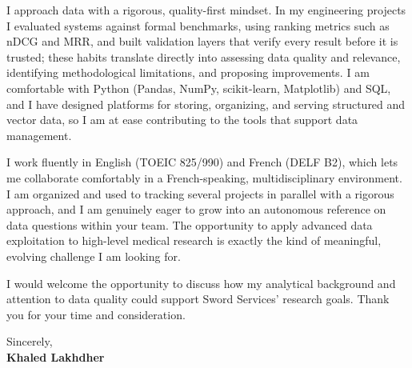 \documentclass[11pt,a4paper]{article}
\begin{document}
I approach data with a rigorous, quality-first mindset. In my engineering projects I evaluated systems against formal benchmarks, using ranking metrics such as nDCG and MRR, and built validation layers that verify every result before it is trusted; these habits translate directly into assessing data quality and relevance, identifying methodological limitations, and proposing improvements. I am comfortable with Python (Pandas, NumPy, scikit-learn, Matplotlib) and SQL, and I have designed platforms for storing, organizing, and serving structured and vector data, so I am at ease contributing to the tools that support data management.

I work fluently in English (TOEIC 825/990) and French (DELF B2), which lets me collaborate comfortably in a French-speaking, multidisciplinary environment. I am organized and used to tracking several projects in parallel with a rigorous approach, and I am genuinely eager to grow into an autonomous reference on data questions within your team. The opportunity to apply advanced data exploitation to high-level medical research is exactly the kind of meaningful, evolving challenge I am looking for.

I would welcome the opportunity to discuss how my analytical background and attention to data quality could support Sword Services' research goals. Thank you for your time and consideration.

\vspace{6pt}
Sincerely,\\[10pt]
\textbf{Khaled Lakhdher}
\end{document}

